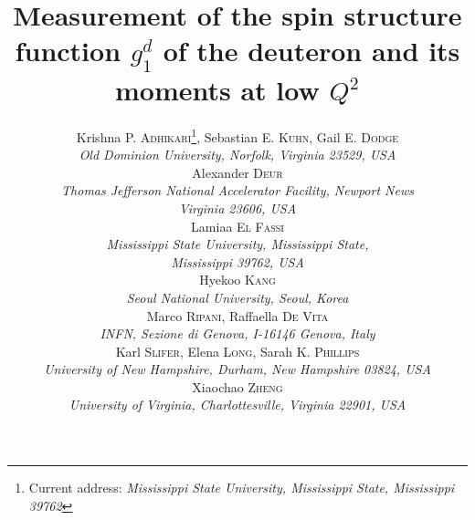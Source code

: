 \documentclass[a4paper,12pt,twoside,epsfig]{report}%
\begin{document}
\makeatother %


\title{Measurement of the spin structure function $g^d_{1}$ of the deuteron and its moments at low $Q^2$}
\begin{comment}
\author{Krishna P. Adhikari, Sebastian E. Kuhn, \\*
Alexander Deur, Lamiaa El Fassi, Hyekoo Kang, Sarah K. Phillips, \\* %
Marco Ripani, Karl Slifer, Raffaella De Vita, Gail E. Dodge, \\*
 Xiaochao Zheng}
\end{comment}

\author{
  Krishna \textsc{P. Adhikari}\footnote{ Current address: \it Mississippi State University, Mississippi State, Mississippi 39762}, Sebastian \textsc{E. Kuhn}, Gail \textsc{E. Dodge} \\
  {\it Old Dominion University, Norfolk, Virginia 23529, USA} \\
  Alexander \textsc{Deur} \\
  {\it Thomas Jefferson National Accelerator Facility, Newport News} \\
  {\it Virginia 23606, USA} \\
  Lamiaa \textsc{El Fassi} \\
  {\it Mississippi State University, Mississippi State,} \\
  {\it Mississippi 39762, USA} \\
  Hyekoo \textsc{Kang} \\
  {\it Seoul National University, Seoul, Korea} \\
  Marco \textsc{Ripani}, Raffaella \textsc{De Vita} \\
  {\it INFN, Sezione di Genova, I-16146 Genova, Italy} \\
  Karl \textsc{Slifer}, Elena \textsc{Long}, Sarah \textsc{K. Phillips} \\
  {\it University of New Hampshire, Durham, New Hampshire 03824, USA} \\
  Xiaochao \textsc{Zheng} \\
  {\it University of Virginia, Charlottesville, Virginia 22901, USA}   
}
 


\maketitle
\end{document}
